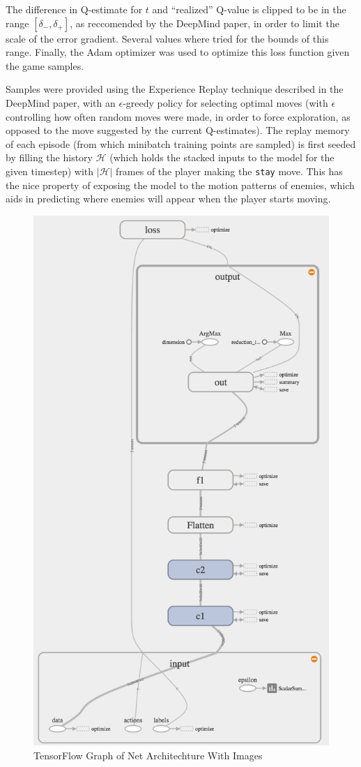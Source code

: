\documentclass[12pt]{article}
\begin{document}
The difference in Q-estimate for $t$ and ``realized'' Q-value is clipped to be in the range $[\delta_{-}, \delta_{+}]$, as reccomended by the DeepMind paper, in order to limit the scale of the error gradient. Several values where tried for the bounds of this range. Finally, the Adam optimizer was used to optimize this loss function given the game samples.

Samples were provided using the Experience Replay technique described in the DeepMind paper, with an $\epsilon$-greedy policy for selecting optimal moves (with $\epsilon$ controlling how often random moves were made, in order to force exploration, as opposed to the move suggested by the current Q-estimates). The replay memory of each episode (from which minibatch training points are sampled) is first seeded by filling the history $\mathcal{H}$ (which holds the stacked inputs to the model for the given timestep) with $|\mathcal{H}|$ frames of the player making the \texttt{stay} move. This has the nice property of exposing the model to the motion patterns of enemies, which aids in predicting where enemies will appear when the player starts moving.

\begin{figure}[H]
  \includegraphics[height=1\textwidth]{report/image_graph}
  \centering
  \caption{TensorFlow Graph of Net Architechture With Images}
  \label{fig:imgraph}
\end{figure}
\end{document}
